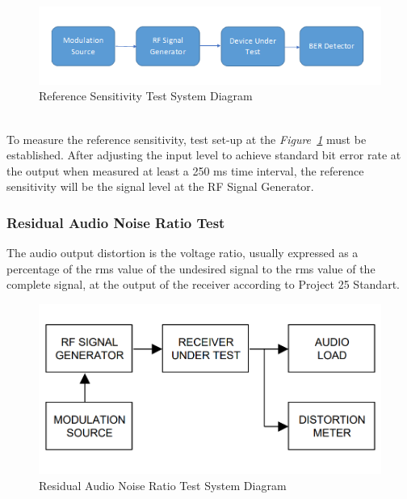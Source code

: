 \begin{figure}[H]
	\center
	\setlength{\unitlength}{\textwidth} 
	\includegraphics[width=1.0\unitlength]{refsens}
	\caption{\label{fig:refsens}Reference Sensitivity Test System Diagram }
\end{figure}

\- \\

	To measure the reference sensitivity, test set-up at the \textit{Figure~\ref{fig:refsens}} must be established. After adjusting the input level to achieve   standard bit error rate at the output when measured at least a 250 ms time interval, the reference sensitivity will be the signal level at the RF Signal Generator.\\

\subsubsection{Residual Audio Noise Ratio Test}
\- \indent
	The audio output distortion is the voltage ratio, usually expressed as a percentage of the rms value of the undesired signal to the rms value of the complete signal, at the output of the receiver according to Project 25 Standart\cite{P25}.

\begin{figure}[H]
	\center
	\setlength{\unitlength}{\textwidth} 
	\includegraphics[width=0.75\unitlength]{resaudtest}
	\caption{\label{fig:resaudtest}Residual Audio Noise Ratio Test System Diagram }
\end{figure}

